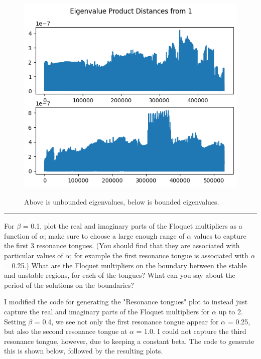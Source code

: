 \documentclass[12pt]{article}
\newcommand{\jump}{\vspace{5mm}}
\begin{document}
\begin{enumerate}[]
\begin{figure}[!h]
\centering
\includegraphics[scale = 0.7]{Images/unbounded_bounded_ev_plots.png}
\label{png:mag_plots}
\caption{Above is unbounded eigenvalues, below is bounded eigenvalues.}
\end{figure}

\vspace{\floatsep}
\clearpage
\jump
\hrule
\jump

For $\beta$ = 0.1, plot the real and imaginary parts of the Floquet multipliers as a function of $\alpha$; make sure to choose a large enough range of $\alpha$ values to capture the first 3 resonance tongues. (You should find that they are associated with particular values of $\alpha$; for example the first resonance tongue is associated with $\alpha$ = 0.25.) What are the Floquet multipliers on the boundary between the stable and unstable regions, for each of the tongues? What can you say about the period of the solutions on the boundaries?

\jump
\begin{solution}
    
I modified the code for generating the "Resonance tongues" plot to instead just capture the real and imaginary parts of the Floquet multipliers for $\alpha$ up to 2. Setting $\beta$ = 0.4, we see not only the first resonance tongue appear for $\alpha$ = 0.25, but also the second resonance tongue at $\alpha$ = 1.0. I could not capture the third resonance tongue, however, due to keeping a constant beta. The code to generate this is shown below, followed by the resulting plots.


\end{solution}
\end{enumerate}
\end{document}
